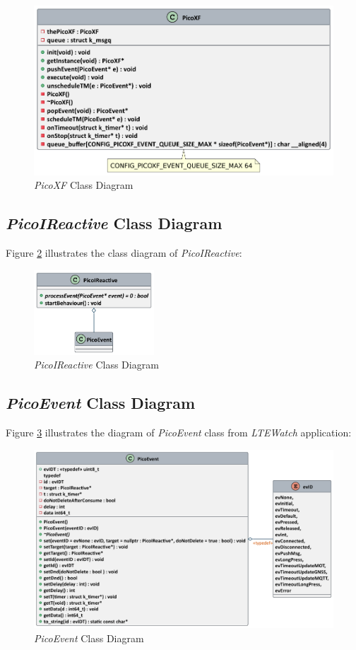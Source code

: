 \documentclass[report.tex]{subfiles}
\begin{document}
\begin{figure}[H]
	\centering
	\includegraphics[width=1\textwidth]{Include/Figure/software/class/picoxf.pdf}
	\caption{\textit{PicoXF} Class Diagram}
	\label{fig:picoxf}
\end{figure}

\subsection{\textit{PicoIReactive} Class Diagram}

Figure \ref{fig:PicoIReactive} illustrates the class diagram of \textit{PicoIReactive}: 

\begin{figure}[H]
	\centering
	\includegraphics[width=0.4\textwidth]{Include/Figure/software/class/PicoIReactive.pdf}
	\caption{\textit{PicoIReactive} Class Diagram}
	\label{fig:PicoIReactive}
\end{figure}

\pagebreak
\subsection{\textit{PicoEvent} Class Diagram}
Figure \ref{fig:picoevent} illustrates the diagram of \textit{PicoEvent} class from \textit{LTEWatch} application: 

\begin{figure}[H]
	\centering
	\includegraphics[width=1\textwidth]{Include/Figure/software/class/picoevent.pdf}
	\caption{\textit{PicoEvent} Class Diagram}
	\label{fig:picoevent}
\end{figure}
\end{document}

